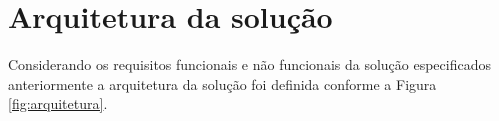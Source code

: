 \section{Arquitetura da solução}

Considerando os requisitos funcionais e não funcionais da solução especificados anteriormente a arquitetura da solução foi definida 
conforme a Figura \ref{fig:arquitetura}.














